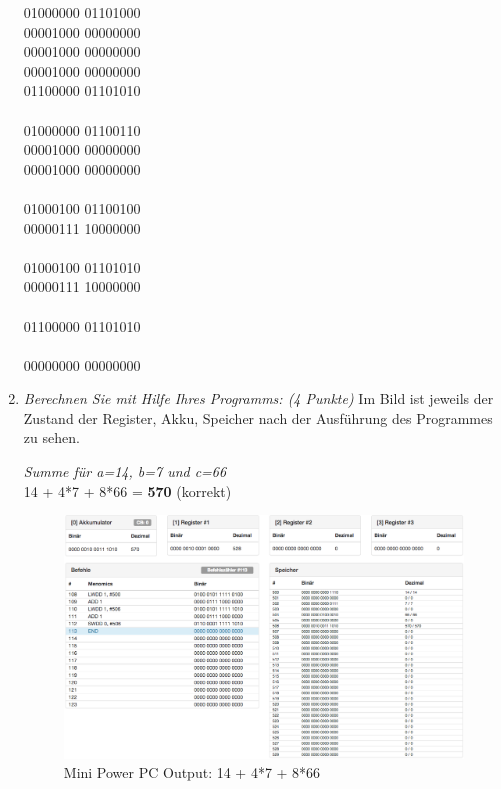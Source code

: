 \documentclass[10pt]{article}
\begin{document}
\begin{enumerate}[label=\alph*)]
			01000000 01101000 \\
			00001000 00000000 \\
			00001000 00000000 \\
			00001000 00000000 \\
			01100000 01101010 \\
			\\
			01000000 01100110 \\
			00001000 00000000 \\
			00001000 00000000 \\
			\\
			01000100 01100100 \\ %
			00000111 10000000 \\
			\\
			01000100 01101010 \\ %
			00000111 10000000 \\
			\\
			01100000 01101010 \\
			\\
			00000000 00000000
			
			
	\item
			\textit{Berechnen Sie mit Hilfe Ihres Programms: (4 Punkte)}
			Im Bild ist jeweils der Zustand der Register, Akku, Speicher nach der Ausführung des Programmes zu sehen.
			
			
			\textit{Summe für a=14, b=7 und c=66}\\
			14 + 4*7 + 8*66 = \textbf{570} (korrekt)
			
			\begin{figure}[H]
				\centering
				\includegraphics[width=\textwidth]{images/4c_a.png}
				\caption{Mini Power PC Output: 14 + 4*7 + 8*66}
				\label{fig:Bild1}
			\end{figure}



\end{enumerate}
\end{document}
